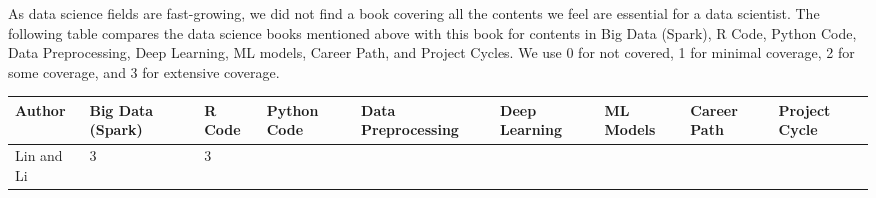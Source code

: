 \documentclass[12pt,]{krantz}
\begin{document}
As data science fields are fast-growing, we did not find a book covering all the contents we feel are essential for a data scientist. The following table compares the data science books mentioned above with this book for contents in Big Data (Spark), R Code, Python Code, Data Preprocessing, Deep Learning, ML models, Career Path, and Project Cycles. We use 0 for not covered, 1 for minimal coverage, 2 for some coverage, and 3 for extensive coverage.

\begin{longtable}[]{@{}lllllllll@{}}
\toprule
\begin{minipage}[b]{0.08\columnwidth}\raggedright
Author\strut
\end{minipage} & \begin{minipage}[b]{0.12\columnwidth}\raggedright
Big Data (Spark)\strut
\end{minipage} & \begin{minipage}[b]{0.05\columnwidth}\raggedright
R Code\strut
\end{minipage} & \begin{minipage}[b]{0.08\columnwidth}\raggedright
Python Code\strut
\end{minipage} & \begin{minipage}[b]{0.08\columnwidth}\raggedright
Data Preprocessing\strut
\end{minipage} & \begin{minipage}[b]{0.10\columnwidth}\raggedright
Deep Learning\strut
\end{minipage} & \begin{minipage}[b]{0.07\columnwidth}\raggedright
ML Models\strut
\end{minipage} & \begin{minipage}[b]{0.08\columnwidth}\raggedright
Career Path\strut
\end{minipage} & \begin{minipage}[b]{0.10\columnwidth}\raggedright
Project Cycle\strut
\end{minipage}\tabularnewline
\midrule
\endhead
\begin{minipage}[t]{0.08\columnwidth}\raggedright
Lin and Li\strut
\end{minipage} & \begin{minipage}[t]{0.12\columnwidth}\raggedright
3\strut
\end{minipage} & \begin{minipage}[t]{0.05\columnwidth}\raggedright
3\strut
\end{minipage} & \begin{minipage}[t]{0.08\columnwidth}\raggedright

\end{minipage}
\end{longtable}
\end{document}
